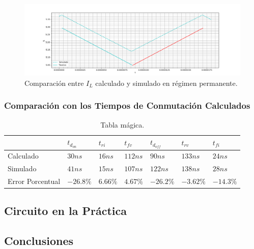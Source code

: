 \begin{figure}[H]
	\centering
	\includegraphics[width=0.8\linewidth]{ImagenesEjercicio-1/il_permanente_sim}
	\caption{Comparación entre $I_L$ calculado y simulado en régimen permanente.}
	\label{ej1:fig:il_permanente_sum}
\end{figure}

\subsubsection{Comparación con los Tiempos de Conmutación Calculados}


\begin{table}[H]
\centering
\begin{tabular}{@{}lllllll@{}}
\toprule
 & $t_{d_{on}}$ & $t_{ri}$ & $t_{fv}$ & $t_{d_{off}}$ & $t_{rv}$ & $t_{fi}$ \\ \midrule
Calculado & $30ns$ & $16ns$ & $112ns$ & $90ns$ & $133ns$ & $24ns$ \\
Simulado & $41ns$ & $15ns$ & $107ns$ & $122ns$ & $138ns$ & $28ns$ \\
Error Porcentual & $-26.8\%$ & $6.66\%$ & $4.67\%$ & $-26.2\%$ & $-3.62\%$ & $-14.3\%$ \\ \bottomrule
\end{tabular}
\caption{Tabla mágica.}
\end{table}

\subsection{Circuito en la Práctica}

\subsection{Conclusiones}


